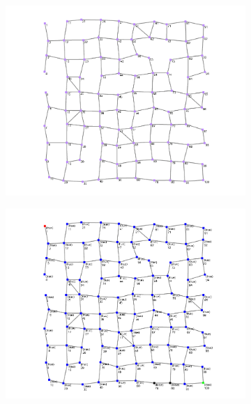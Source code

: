 \documentclass[12pt,a4paper,openright,twoside]{book}
\begin{document}
\begin{figure}[h!]
    \centering
    \begin{subfigure}[b]{0.49\textwidth}
        \centering
        \includegraphics[width=\textwidth]{figures/channel1.png}
    \end{subfigure}
    \hfill
    \begin{subfigure}[b]{0.49\textwidth}
        \centering
        \includegraphics[width=\textwidth]{figures/channel2.png}
    \end{subfigure}
    \hfill
    \begin{subfigure}[b]{0.49\textwidth}
        \centering

\end{subfigure}
\end{figure}
\end{document}

